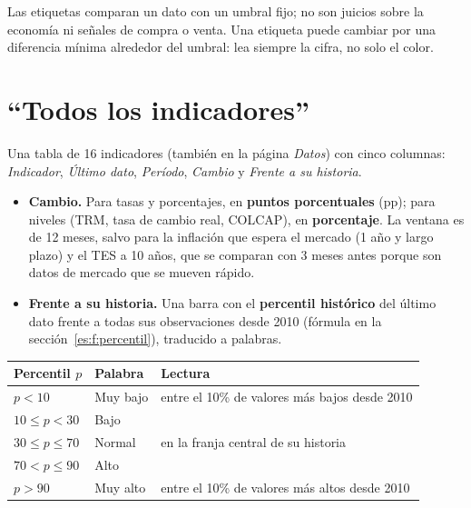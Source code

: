 \begin{alerta}
Las etiquetas comparan un dato con un umbral fijo; no son juicios sobre la economía ni señales de compra o
venta. Una etiqueta puede cambiar por una diferencia mínima alrededor del umbral: lea siempre la cifra, no solo
el color.
\end{alerta}

\section{``Todos los indicadores''}
\label{es:u:tabla}
Una tabla de 16 indicadores (también en la página \emph{Datos}) con cinco columnas: \emph{Indicador},
\emph{Último dato}, \emph{Período}, \emph{Cambio} y \emph{Frente a su historia}.

\begin{itemize}
\item \textbf{Cambio.} Para tasas y porcentajes, en \textbf{puntos porcentuales} (pp); para niveles (TRM,
  tasa de cambio real, COLCAP), en \textbf{porcentaje}. La ventana es de 12 meses, salvo para la inflación que
  espera el mercado (1 año y largo plazo) y el TES a 10 años, que se comparan con 3 meses antes porque son
  datos de mercado que se mueven rápido.
\item \textbf{Frente a su historia.} Una barra con el \textbf{percentil histórico} del último dato frente a
  todas sus observaciones desde 2010 (fórmula en la sección~\ref{es:f:percentil}), traducido a palabras.
\end{itemize}

\begin{center}\small
\begin{tabular}{@{}lll@{}}
\toprule
\textbf{Percentil $p$} & \textbf{Palabra} & \textbf{Lectura}\\\midrule
$p<10$ & Muy bajo & entre el 10\% de valores más bajos desde 2010\\
$10\le p<30$ & Bajo & \\
$30\le p\le 70$ & Normal & en la franja central de su historia\\
$70< p\le 90$ & Alto & \\
$p>90$ & Muy alto & entre el 10\% de valores más altos desde 2010\\
\bottomrule
\end{tabular}
\end{center}

